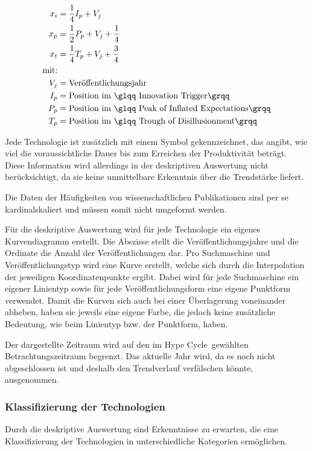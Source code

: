\begin{align}
x_i &= \frac{1}{4}I_p+V_j \label{eq:pos_i}\\
x_p &= \frac{1}{2}P_p+V_j+\frac{1}{4} \label{eq:pos_p}\\
x_t &= \frac{1}{4}T_p+V_j+\frac{3}{4} \label{eq:pos_t}\\
\text{mit:}\nonumber\\
V_j &= \text{Veröffentlichungsjahr}\nonumber\\
I_p &= \text{Position im \glqq Innovation Trigger\grqq}\nonumber\\
P_p &= \text{Position im \glqq Peak of Inflated Expectations\grqq}\nonumber\\
T_p &= \text{Position im \glqq Trough of Disillusionment\grqq}\nonumber
\end{align}

Jede Technologie ist zusätzlich mit einem Symbol gekennzeichnet, das angibt, wie viel die voraussichtliche Dauer bis zum Erreichen der Produktivität beträgt. Diese Information wird allerdings in der deskriptiven Auswertung nicht berücksichtigt, da sie keine unmittelbare Erkenntnis über die Trendstärke liefert.

Die Daten der Häufigkeiten von wissenschaftlichen Publikationen sind per se kardinalskaliert und müssen somit nicht umgeformt werden.

Für die deskriptive Auswertung wird für jede Technologie ein eigenes Kurvendiagramm erstellt. Die Abszisse stellt die Veröffentlichungsjahre und die Ordinate die Anzahl der Veröffentlichungen dar. Pro Suchmaschine und Veröffentlichungstyp wird eine Kurve erstellt, welche sich durch die Interpolation der jeweiligen Koordinatenpunkte ergibt. Dabei wird für jede Suchmaschine ein eigener Linientyp sowie für jede Veröffentlichungsform eine eigene Punktform verwendet. Damit die Kurven sich auch bei einer Überlagerung voneinander abheben, haben sie jeweils eine eigene Farbe, die jedoch keine zusätzliche Bedeutung, wie beim Linientyp bzw. der Punktform, haben.

Der dargestellte Zeitraum wird auf den im \glqq Hype Cycle\grqq~gewählten Betrachtungszeitraum begrenzt. Das aktuelle Jahr wird, da es noch nicht abgeschlossen ist und deshalb den Trendverlauf verfälschen könnte, ausgenommen.

\subsubsection{Klassifizierung der Technologien}\label{sec:class_tech}
Durch die deskriptive Auswertung sind Erkenntnisse zu erwarten, die eine Klassifizierung der Technologien in unterschiedliche Kategorien ermöglichen.

